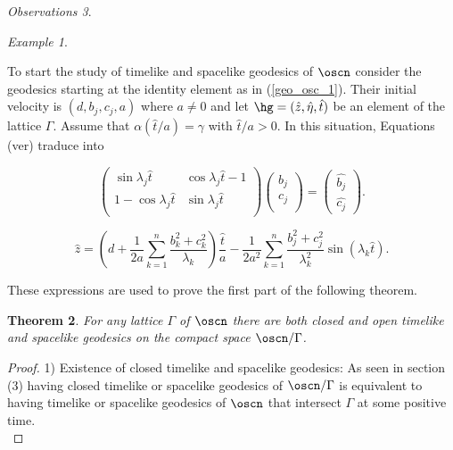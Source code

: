 \documentclass[11pt]{amsart}
\theoremstyle{plain}
\newtheorem{thm}{Theorem}[section]
\theoremstyle{definition}
\theoremstyle{remark}
\newtheorem{exa}[thm]{Example}
\newtheorem{obs}[thm]{Observations}
\begin{document}
\begin{obs}
\begin{exa}
\end{exa}


To start the study of timelike and spacelike geodesics of $\oscn$ consider the geodesics starting at the identity element as in (\ref{geo_osc_1}). Their initial velocity is $(d,b_j,c_j,a)$ where $a\neq0$ and let $\hg=(\hat{z}, \hat{\eta}, \hat{t})$ be an element of the lattice $\Gamma$. Assume that $\alpha(\hat{t}/a)=\gamma$ with $\hat{t}/a > 0$. In this situation, Equations (ver) traduce into
    
    \begin{equation}\label{oscilador_geos_1}
    \left( \begin{matrix}
    \sin{\lambda_j \hat{t}} & \cos{\lambda_j \hat{t}} -1 \\
    1 - \cos{\lambda_j \hat{t}} & \sin{\lambda_j \hat{t}} \\
    \end{matrix} \right)
    \left( \begin{matrix}
    b_j \\
    c_j \\
    \end{matrix} \right)=
    \left( \begin{matrix}
    \hat{b_j} \\
    \hat{c_j}
    \end{matrix} \right).
    \end{equation}

    \begin{equation}\label{oscilador_geos_2}
        \hat{z} =  \left(d + \frac{1}{2 a} \sum_{k=1}^{n} \frac{ b_{k}^{2}+c_k^{2}}{\lambda_k}\right)\frac{\hat{t}}{a}- \frac{1}{2 a^{2}}  \sum_{k=1}^{n} \frac{b_{j}^{2}+c_j^2}{\lambda_k^{2}} \sin(\lambda_k \hat{t}).
    \end{equation}

These expressions are used to prove the first part of the following theorem.



\begin{thm}
    For any lattice $\Gamma$ of $\oscn$ there are both closed and open timelike and spacelike geodesics on the compact space $\oscn / \Gamma$.
\end{thm}

\begin{proof}


1) Existence of closed timelike and spacelike geodesics: As seen in section (3) having closed timelike or spacelike geodesics of $\oscn/\Gamma$ is equivalent to having timelike or spacelike geodesics of $\oscn$ that intersect $\Gamma$ at some positive time.\\


\end{proof}
\end{obs}
\end{document}
